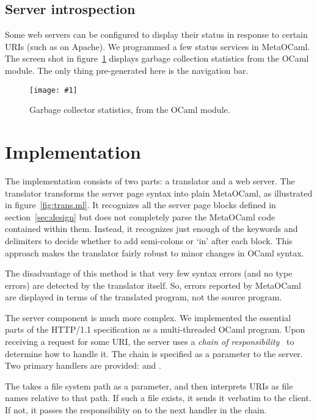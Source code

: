 \documentclass{elsart}
\def\MOC{MetaOCaml\xspace}
\newcommand{\myfig}[3]{%
  \begin{figure}[tbp]%
    #3%
    \caption{#2}%
    \label{fig:#1}%
  \end{figure}}
\newcommand{\screenshot}[2]{%
  \myfig{#1}{#2}
  {\centering%
    \texttt{[image: \#1]}}}
\def\lgrindfile#1{
  \par\vskip.5\baselineskip\begingroup
  \begin{lgrind}\relax
  \end{lgrind}\endgroup}
\begin{document}
\subsection{Server introspection}

Some web servers can be configured to display their status in response
to certain URIs (such as  on Apache).  We
programmed a few status services in \MOC.  The screen shot in
figure~\ref{fig:gc} displays garbage collection statistics from the
OCaml  module.  The only thing pre-generated here is the
navigation bar.

\screenshot{gc}{Garbage collector statistics, from the OCaml \id{gc}
  module.}


\section{Implementation}
\label{sec:impl}

The implementation consists of two parts: a translator and a web
server.  The translator transforms the server page syntax into plain
\MOC, as illustrated in figure~\ref{fig:trans.ml}.  It recognizes all
the server page blocks defined in section~\ref{sec:design} but does
not completely parse the \MOC code contained within them.  Instead, it
recognizes just enough of the keywords and delimiters to decide
whether to add semi-colons or `{\KWfont in}' after each block.  This
approach makes the translator fairly robust to minor changes in OCaml
syntax.

The disadvantage of this method is that very few syntax errors (and
no type errors) are detected by the translator itself.  So, errors
reported by \MOC are displayed in terms of the translated program, not
the source program.

The server component is much more complex.  We implemented the
essential parts of the HTTP/1.1 specification as a multi-threaded
OCaml program.  Upon receiving a request for some URI, the server uses
a \emph{chain of responsibility}~\cite{gamma95design} to determine
how to handle it.  The chain is specified as a parameter to the
server.  Two primary handlers are provided:  and
.

The  takes a file system path as a parameter, and then
interprets URIs as file names relative to that path.  If such a file
exists, it sends it verbatim to the client.  If not, it passes
the responsibility on to the next handler in the chain.
\end{document}

